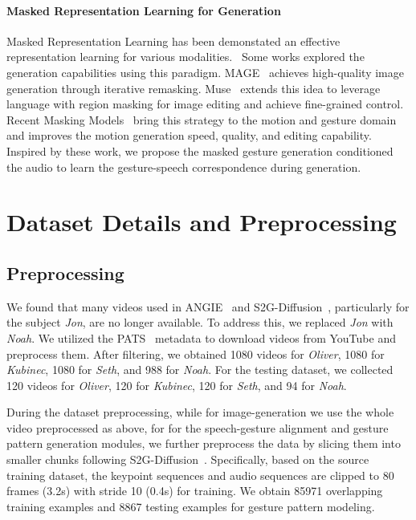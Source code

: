 \paragraph{Masked Representation Learning for Generation}
Masked Representation Learning has been demonstated an effective representation learning for various modalities.~\cite{devlin2018bert, he2022masked} Some works explored the generation capabilities using this paradigm. MAGE~\cite{li2023mage} achieves high-quality image generation through iterative remasking. Muse~\cite{chang2023muse} extends this idea to leverage language with region masking for image editing and achieve fine-grained control. Recent Masking Models~\cite{pinyoanuntapong2024mmm, moMask, wang2023t2mhifigptgeneratinghighquality, Mao_2024} bring this strategy to the motion and gesture domain and improves the motion generation speed, quality, and editing capability. Inspired by these work, we propose the masked gesture generation conditioned the audio to learn the gesture-speech correspondence during generation.

\section{Dataset Details and Preprocessing}
\label{sec:sub_dataset}

\subsection{Preprocessing}
We found that many videos used in ANGIE~\cite{angie} and S2G-Diffusion~\cite{s2gdiffusion}, particularly for the subject \textit{Jon}, are no longer available. To address this, we replaced \textit{Jon} with \textit{Noah}. We utilized the PATS~\cite{ginosar2019gestures} metadata to download videos from YouTube and preprocess them. After filtering, we obtained 1080 videos for \textit{Oliver}, 1080 for \textit{Kubinec}, 1080 for \textit{Seth}, and 988 for \textit{Noah}. For the testing dataset, we collected 120 videos for \textit{Oliver}, 120 for \textit{Kubinec}, 120 for \textit{Seth}, and 94 for \textit{Noah}.

During the dataset preprocessing, while for image-generation we use the whole video preprocessed as above, for for the speech-gesture alignment and gesture pattern generation modules, we further preprocess the data by slicing them into smaller chunks following S2G-Diffusion~\cite{s2gdiffusion}. Specifically, based on the source training dataset, the keypoint sequences and audio sequences are clipped to 80 frames (3.2s) with stride 10 (0.4s) for training. We obtain 85971 overlapping training examples and 8867 testing examples for gesture pattern modeling.

